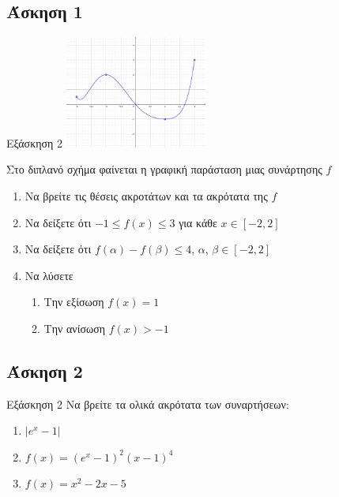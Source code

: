 \documentclass[greek]{beamer}
\begin{document}
\subsection{Άσκηση 1}
\begin{frame}[label=Άσκηση1,t]{Εξάσκηση 2}
      \centering
      \includegraphics[width=0.35\textwidth]{"images/1.3.2 Μονοτονία.png"}

      Στο διπλανό σχήμα φαίνεται η γραφική παράσταση μιας συνάρτησης $f$
      \begin{enumerate}
            \item Να βρείτε τις θέσεις ακροτάτων και τα ακρότατα της $f$\pause
            \item Να δείξετε ότι $-1\le f(x) \le 3$ για κάθε $x\in[-2,2]$\pause
            \item Να δείξετε ότι $f(α)-f(β)\le 4$, $α$, $β\in[-2,2]$ \pause
            \item Να λύσετε
                  \begin{enumerate}
                        \item Την εξίσωση $f(x)=1$ \pause
                        \item Την ανίσωση $f(x)>-1$
                  \end{enumerate}
      \end{enumerate}
\end{frame}

\subsection{Άσκηση 2}
\begin{frame}[label=Άσκηση2,t]{Εξάσκηση 2}
      Να βρείτε τα ολικά ακρότατα των συναρτήσεων:
      \begin{enumerate}
            \item $|e^x-1|$ \pause
            \item $f(x)=(e^x-1)^2(x-1)^4$ \pause
            \item $f(x)=x^2-2x-5$
      \end{enumerate}
\end{frame}
\end{document}
